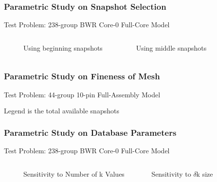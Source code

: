 \documentclass[fleqn]{beamer}
\begin{document}
  \begin{frame}[noframenumbering]
      \frametitle{Parametric Study on Snapshot Selection}
      \centering
      Test Problem: 238-group BWR Core-0 Full-Core Model
      \begin{figure}
          \begin{columns}[T]
              \begin{column}{0.5\linewidth}
                  Using beginning snapshots
              \end{column}
              \begin{column}{0.5\linewidth}
                  Using middle snapshots
              \end{column}
          \end{columns}
      \end{figure}
  \end{frame}
  
    \begin{frame}[noframenumbering]
      \frametitle{Parametric Study on Fineness of Mesh}
      \centering
      Test Problem: 44-group 10-pin Full-Assembly Model
      \begin{figure}
                  
      \end{figure}
      \centering
      Legend is the total available snapshots
  \end{frame}
  
    \begin{frame}[noframenumbering]
      \frametitle{Parametric Study on Database Parameters}
      \centering
      Test Problem: 238-group BWR Core-0 Full-Core Model
      \begin{figure}
          \begin{columns}[T]
              \begin{column}{0.5\linewidth}
                  Sensitivity to Number of k Values
              \end{column}
              \begin{column}{0.5\linewidth}
                  Sensitivity to $\delta$k size
              \end{column}
          \end{columns}
      \end{figure}
  \end{frame}
  
  \backupend
  
\end{document}
